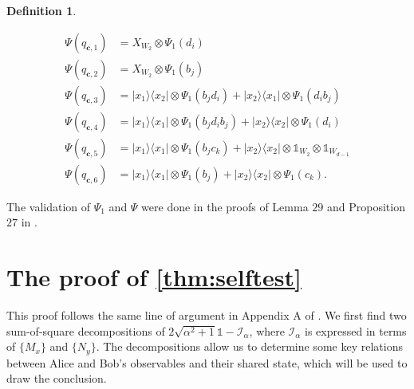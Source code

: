\documentclass[11pt,letterpaper]{article}
\newcommand{\ketbra}[2]{|#1\rangle\langle#2|}
\newcommand{\x}{\otimes}
\newcommand{\1}{\mathbb{1}}
\newcommand{\bc}{\pmb{c}}
\newcommand{\I}{\mathcal{I}}
\newtheorem{definition}[theorem]{Definition}
\theoremstyle{definition}
\begin{document}
\begin{definition}
\begin{itemize}
\begin{align*}
	\Psi(q_{\bc, 1}) &= X_{W_2} \x \Psi_1(d_i) \\
	\Psi(q_{\bc, 2}) &= X_{W_2} \x \Psi_1(b_j) \\
	\Psi(q_{\bc, 3}) &= \ketbra{x_1}{x_2} \x  \Psi_1(b_jd_i) + \ketbra{x_2}{x_1} \x \Psi_1(d_ib_j)\\
	\Psi(q_{\bc, 4}) &= \ketbra{x_1}{x_1} \x \Psi_1(b_jd_ib_j) + \ketbra{x_2}{x_2} \x  \Psi_1(d_i)\\
	\Psi(q_{\bc, 5}) &=  \ketbra{x_1}{x_1} \x \Psi_1(b_jc_k) + \ketbra{x_2}{x_2} \x \1_{W_2} \x \1_{W_{d-1}}\\
	\Psi(q_{\bc, 6}) &= \ketbra{x_1}{x_1} \x \Psi_1(b_j) + \ketbra{x_2}{x_2} \x \Psi_1(c_{k}).
\end{align*}
\end{itemize}
\end{definition}
The validation of $\Psi_1$ and $\Psi$ were done in the proofs of 
Lemma $29$ and Proposition $27$ in \cite{slofstra2017}.
\section{The proof of \cref{thm:selftest} }
\label{sec:w_chsh_proof}
This proof follows the same line of argument in Appendix A of \cite{bamps2015}.
We first find two sum-of-square decompositions of $2\sqrt{\alpha^2+1} \1 - \I_\alpha$,
where $\I_\alpha$ is expressed in terms of $\{M_x\}$ and $\{N_y\}$.
The decompositions allow us to determine some key relations between Alice and Bob's observables
and their shared state, which will be used to draw the conclusion.
\end{document}

